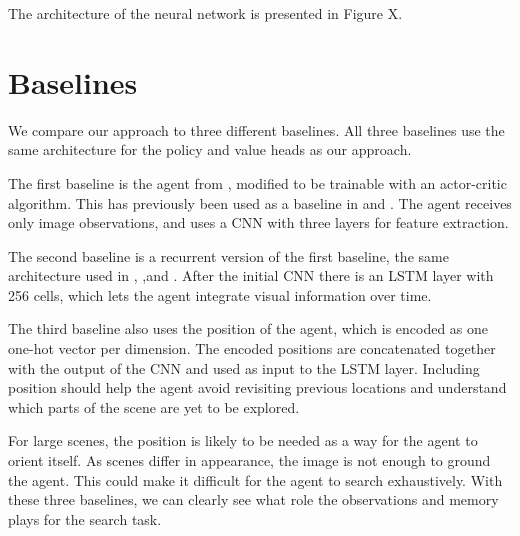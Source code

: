 The architecture of the neural network is presented in Figure X.



\section{Baselines}
\label{sec:baseline}

We compare our approach to three different baselines.
All three baselines use the same architecture for the policy and value heads as our approach.

The first baseline is the agent from \cite{mnih_human_2015}, modified to be trainable with an actor-critic algorithm.
This has previously been used as a baseline in \cite{mirowski_navigate_2017} and \cite{cobbe_procgen_2020}.
The agent receives only image observations, and uses a CNN with three layers for feature extraction.

The second baseline is a recurrent version of the first baseline, the same architecture used in \cite{mnih_asynchronous_2016}, \cite{mirowski_navigate_2017},and \cite{gupta_cognitive_2019}.
After the initial CNN there is an LSTM layer with 256 cells,
which lets the agent integrate visual information over time.

The third baseline also uses the position of the agent, which is encoded as one one-hot vector per dimension. 
The encoded positions are concatenated together with the output of the CNN and used as input to the LSTM layer.
Including position should help the agent avoid revisiting previous locations and understand which parts of the scene are yet to be explored. 

For large scenes, the position is likely to be needed as a way for the agent to orient itself.
As scenes differ in appearance, the image is not enough to ground the agent.
This could make it difficult for the agent to search exhaustively.
With these three baselines, we can clearly see what role the observations and memory plays for the search task.

